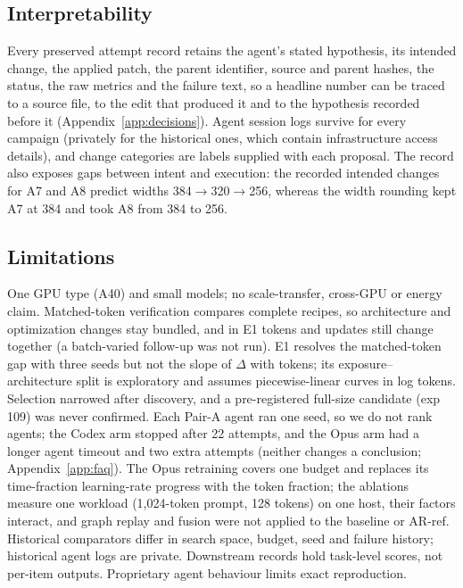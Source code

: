 \documentclass{article}
\newif\ifshowhumanmarkers \showhumanmarkersfalse
\newcommand{\humantag}[1]{{\color{humanframe}\sffamily\scriptsize\bfseries HUMAN AUTHOR MUST REWRITE/VERIFY [#1]}\ }
\newcommand{\humanauthor}[2][]{\ifshowhumanmarkers\begin{humanbox}\humantag{#1}#2\end{humanbox}\else #2\par\fi}
\begin{document}
\subsection{Interpretability}
\humanauthor[P2-13]{Every preserved attempt record retains the agent's stated hypothesis, its intended change, the applied patch, the parent identifier, source and parent hashes, the status, the raw metrics and the failure text, so a headline number can be traced to a source file, to the edit that produced it and to the hypothesis recorded before it (Appendix~\ref{app:decisions}). Agent session logs survive for every campaign (privately for the historical ones, which contain infrastructure access details), and change categories are labels supplied with each proposal. The record also exposes gaps between intent and execution: the recorded intended changes for A7 and A8 predict widths 384$\to$320$\to$256, whereas the width rounding kept A7 at 384 and took A8 from 384 to 256.}

\subsection{Limitations}
\humanauthor[P2-14]{One GPU type (A40) and small models; no scale-transfer, cross-GPU or energy claim. Matched-token verification compares complete recipes, so architecture and optimization changes stay bundled, and in E1 tokens and updates still change together (a batch-varied follow-up was not run). E1 resolves the matched-token gap with three seeds but not the slope of $\Delta$ with tokens; its exposure--architecture split is exploratory and assumes piecewise-linear curves in log tokens. Selection narrowed after discovery, and a pre-registered full-size candidate (exp 109) was never confirmed. Each Pair-A agent ran one seed, so we do not rank agents; the Codex arm stopped after 22 attempts, and the Opus arm had a longer agent timeout and two extra attempts (neither changes a conclusion; Appendix~\ref{app:faq}). The Opus retraining covers one budget and replaces its time-fraction learning-rate progress with the token fraction; the ablations measure one workload (1{,}024-token prompt, 128 tokens) on one host, their factors interact, and graph replay and fusion were not applied to the baseline or AR-ref. Historical comparators differ in search space, budget, seed and failure history; historical agent logs are private. Downstream records hold task-level scores, not per-item outputs. Proprietary agent behaviour limits exact reproduction.}
\end{document}
